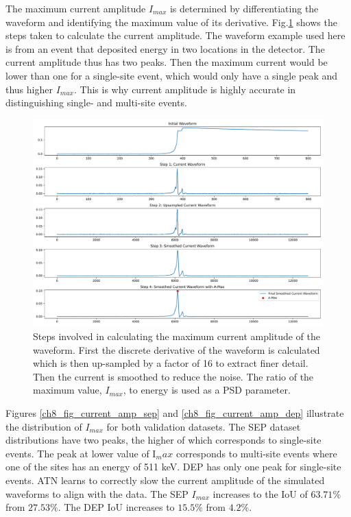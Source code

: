 The maximum current amplitude $I_{max}$ is determined by differentiating the waveform and identifying the maximum value of its derivative. Fig.\ref{fig_ch8_curr_amp_calc} shows the steps taken to calculate the current amplitude. The waveform example used here is from an event that deposited energy in two locations in the detector. The current amplitude thus has two peaks. Then the maximum current would be lower than one for a single-site event, which would only have a single peak and thus higher $I_{max}$. This is why current amplitude is highly accurate in distinguishing single- and multi-site events.


\begin{figure}%
    \centering
    \includegraphics[width=0.99\linewidth, trim={0.4cm 0pc 0.3cm 0pc},clip]{ch8/figs/curr_amp_calc.pdf}
    \caption{Steps involved in calculating the maximum current amplitude of the waveform. First the discrete derivative of the waveform is calculated which is then up-sampled by a factor of 16 to extract finer detail. Then the current is smoothed to reduce the noise. The ratio of the maximum value, $I_{max}$, to energy is used as a PSD parameter.}
    \label{fig_ch8_curr_amp_calc}
\end{figure}

Figures \ref{ch8_fig_current_amp_sep} and \ref{ch8_fig_current_amp_dep} illustrate the distribution of $I_{max}$ for both validation datasets. The SEP dataset distributions have two peaks, the higher of which corresponds to single-site events. The peak at lower value of I$_max$ corresponds to multi-site events where one of the sites has an energy of 511 keV. DEP has only one peak for single-site events. ATN learns to correctly slow the current amplitude of the simulated waveforms to align with the data. The SEP $I_{max}$ increases to the IoU of $63.71\%$ from $27.53\%$. The DEP IoU increases to $15.5\%$ from $4.2\%$. 
  
